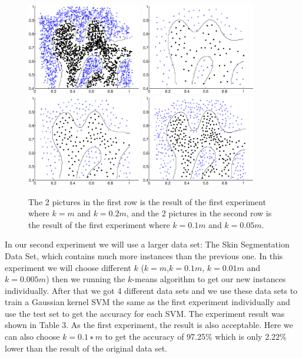 \documentclass[runningheads,a4paper]{llncs}
\begin{document}
\begin{figure}[tbp]
\centering

\includegraphics[height=4cm]{a1.eps}
\includegraphics[height=4cm]{a4.eps}
\includegraphics[height=4cm]{a3.eps}
\includegraphics[height=4cm]{a2.eps}

\caption{The 2 pictures in the first row is the result of the first experiment where $k=m$ and $k=0.2m$, 
		and the 2 pictures in the second row is the result of the first experiment where $k=0.1m$ and $k=0.05m$.}
\label{fig:example1}
\end{figure}		
		
		In our second experiment we will use a larger data set: The Skin Segmentation Data Set, which 
		contains much more instances than the previous one. In this experiment we will choose 
		different $k$ ($k=m$,$k=0.1m$, $k=0.01m$ and $k=0.005m$) then 
		we running the $k$-means algorithm to get our new instances individually. After that we got 4 different
		data sets and we use these data sets to train a Gaussian kernel SVM the same as the first experiment
		individually and use the test set to get the 
		accuracy for each SVM. The experiment result was shown in Table 3. As the first experiment, the result 
		is also acceptable. Here we can also choose $k = 0.1 ∗m$ to get the accuracy of 97.25\% which is 
		only 2.22\% lower than the result of the original data set.
\end{document}
